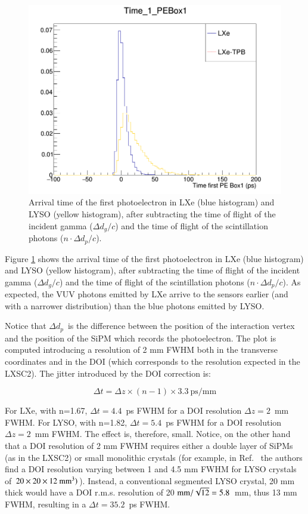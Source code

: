\documentclass[review]{elsarticle}
\begin{document}
\begin{figure}[!bhtp]
	\centering
	\includegraphics[scale=0.5]{../img/FirstPEScintLXeLYSO.png}
	\caption{\label{fig.firstPE} Arrival time of the first photoelectron in LXe (blue histogram) and LYSO (yellow histogram), after subtracting the time of flight of the incident gamma ($\Delta d_g/c$) and the time of flight of the scintillation photons ($n \cdot \Delta d_p/c$). }\label{fig.FirstPE}
\end{figure} 

Figure \ref{fig.FirstPE} shows the arrival time of the first photoelectron in LXe (blue histogram) and LYSO (yellow histogram), after subtracting the time of flight of the incident gamma ($\Delta d_g/c$) and the time of flight of the scintillation photons ($n \cdot \Delta d_p/c$). As expected, the VUV photons emitted by LXe arrive to the sensors earlier (and with a narrower distribution) than the blue photons emitted by LYSO. 

Notice that $\Delta d_p$~is the difference 
between the position of the interaction vertex and the position of the SiPM which records the photoelectron. 
The plot is computed introducing a resolution of 2 mm FWHM both in the transverse coordinates and
in the DOI (which corresponds to the resolution expected in the LXSC2). The jitter introduced by the DOI correction is:

\begin{equation}
\Delta t =\Delta z \times (n-1) \times 3.3\ \textrm{ps/mm}
\label{eq.DOI}
\end{equation}

For LXe, with n=1.67, $\Delta t = 4.4$~ps FWHM for a DOI resolution $\Delta z = 2$~mm FWHM. 
For LYSO, with n=1.82, $\Delta t = 5.4$~ps FWHM for a DOI resolution $\Delta z = 2$~mm FWHM. The effect is, therefore, small. Notice, on the other hand that a DOI resolution of 2 mm FWHM requires either a double layer of SiPMs (as in the LXSC2) or small monolithic crystals (for example, in Ref.~\cite{VanDamm2011} the authors find a DOI resolution varying between 1 and 4.5 mm FWHM for LYSO crystals of 
$20 \times 20 \times 12 ~{\rm mm^3})$). Instead, a conventional segmented LYSO crystal, 20 mm
thick would have a DOI r.m.s. resolution of 20 ${\rm mm}/\sqrt{12} = 5.8$~mm, thus 13 mm FWHM, resulting in a $\Delta t = 35.2$~ps FWHM.
\end{document}
